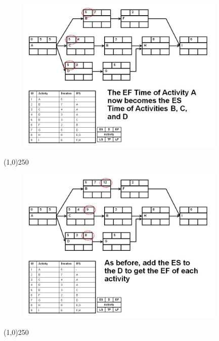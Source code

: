 \begin{frame}
\begin{figure}
	\centering
		\includegraphics[width = 10.0cm]{oldnotes/Slide142.jpg}
\end{figure}
\end{frame}
\begin{center}\line(1,0){250}\end{center}




\begin{frame}
\begin{figure}
	\centering
		\includegraphics[width = 10.0cm]{oldnotes/Slide143.jpg}
\end{figure}
\end{frame}
\begin{center}\line(1,0){250}\end{center}




